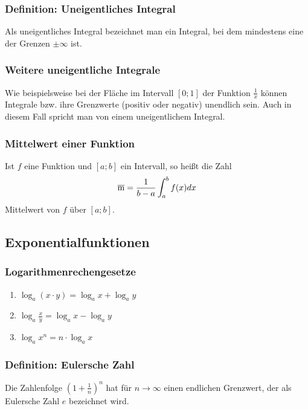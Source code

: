 \documentclass{article}
\begin{document}
  \subsubsection{Definition: Uneigentliches Integral}
  Als uneigentliches Integral bezeichnet man ein Integral, bei dem mindestens eine der Grenzen $\pm \infty$ ist.
  
  \subsubsection{Weitere uneigentliche Integrale}
  Wie beispielsweise bei der Fläche im Intervall $[0;1]$ der Funktion $\frac{1}{x}$ können Integrale bzw. ihre Grenzwerte (positiv oder negativ) unendlich sein. Auch in diesem Fall spricht man von einem uneigentlichem Integral. 
  
  \subsubsection{Mittelwert einer Funktion}
  Ist $f$ eine Funktion und $[a;b]$ ein Intervall, so heißt die Zahl
  \begin{equation*}
  	\overline{\rm m} = \frac{1}{b - a} \int^b_a f(x) dx
  \end{equation*}
  Mittelwert von $f$ über $[a;b]$.
  
  \subsection{Exponentialfunktionen}
  
  \subsubsection{Logarithmenrechengesetze}
  \begin{enumerate}
  	\item $\log_a{(x \cdot y)} = \log_a{x} + \log_a{y}$
  	\item $\log_a{\frac{x}{y}} = \log_a{x} - \log_a{y}$
  	\item $\log_a{x^n} = n \cdot \log_a{x}$
  \end{enumerate}
  
  \subsubsection{Definition: Eulersche Zahl}
  Die Zahlenfolge $(1 + \frac{1}{n})^n$ hat für $n \rightarrow \infty$ einen endlichen Grenzwert, der als Eulersche Zahl $e$ bezeichnet wird.
  
\end{document}
